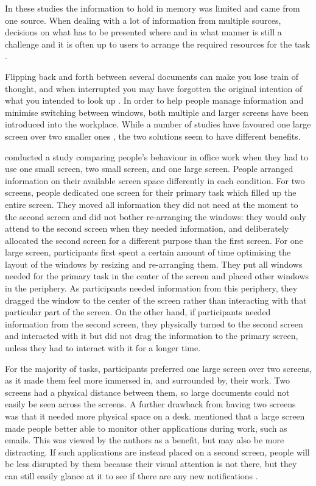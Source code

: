 \documentclass[11pt,oneside]{report}
\begin{document}
In these studies the information to hold in memory was limited and came from one source. When dealing with a lot of information from multiple sources, decisions on what has to be presented where and in what manner is still a challenge and it is often up to users to arrange the required resources for the task \citep{Bardram2006, Grudin2001}.

Flipping back and forth between several documents can make you lose train of thought, and when interrupted you may have forgotten the original intention of what you intended to look up \citep{Grudin2001}.  In order to help people manage information and minimise switching between windows, both multiple and larger screens have been introduced into the workplace. While a number of studies have favoured one large screen over two smaller ones \citep[e.g.][]{Bi2009}, the two solutions seem to have different benefits.

\citet{Bi2009} conducted a study comparing people's behaviour in office work when they had to use one small screen, two small screen, and one large screen. People arranged information on their available screen space differently in each condition. For two screens, people dedicated one screen for their primary task which filled up the entire screen. They moved all information they did not need at the moment to the second screen and did not bother re-arranging the windows: they would only attend to the second screen when they needed information, and deliberately allocated the second screen for a different purpose than the first screen. For one large screen, participants first spent a certain amount of time optimising the layout of the windows by resizing and re-arranging them. They put all windows needed for the primary task in the center of the screen and placed other windows in the periphery.  As participants needed information from this periphery, they dragged the window to the center of the screen rather than interacting with that particular part of the screen. On the other hand, if participants needed information from the second screen, they physically turned to the second screen and interacted with it but did not drag the information to the primary screen, unless they had to interact with it for a longer time.  

For the majority of tasks, participants preferred one large screen over two screens, as it made them feel more immersed in, and surrounded by, their work. Two screens had a physical distance between them, so large documents could not easily be seen across the screens. A further drawback from having two screens was that it needed more physical space on a desk. \citet{Bi2009}  mentioned that a large screen made people better able to monitor other applications during work, such as emails. This was viewed by the authors as a benefit, but may also be more distracting. If such applications are instead placed on a second screen, people will be less disrupted by them because their visual attention is not there, but they can still easily glance at it to see if there are any new notifications \citep{Grudin2001}.  
\end{document}
